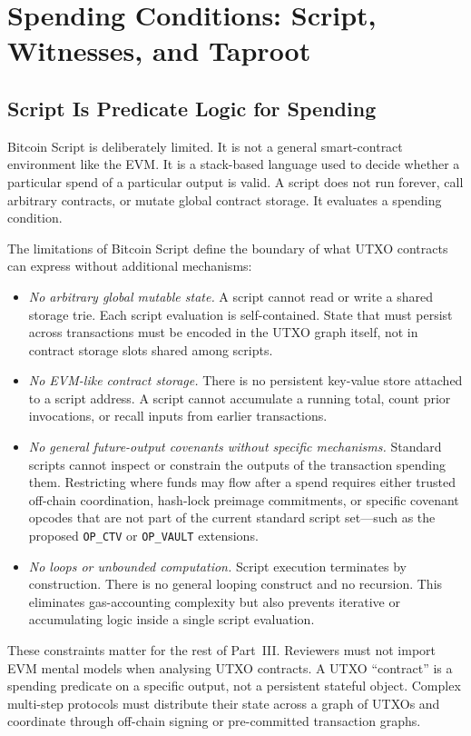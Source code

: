 \section{Spending Conditions: Script, Witnesses, and Taproot}

\subsection{Script Is Predicate Logic for Spending}

Bitcoin Script is deliberately limited. It is not a general smart-contract environment like the EVM. It is a stack-based language used to decide whether a particular spend of a particular output is valid. A script does not run forever, call arbitrary contracts, or mutate global contract storage. It evaluates a spending condition.

The limitations of Bitcoin Script define the boundary of what UTXO contracts can express without additional mechanisms:

\begin{itemize}
\item \emph{No arbitrary global mutable state.} A script cannot read or write a shared storage trie. Each script evaluation is self-contained. State that must persist across transactions must be encoded in the UTXO graph itself, not in contract storage slots shared among scripts.
\item \emph{No EVM-like contract storage.} There is no persistent key-value store attached to a script address. A script cannot accumulate a running total, count prior invocations, or recall inputs from earlier transactions.
\item \emph{No general future-output covenants without specific mechanisms.} Standard scripts cannot inspect or constrain the outputs of the transaction spending them. Restricting where funds may flow after a spend requires either trusted off-chain coordination, hash-lock preimage commitments, or specific covenant opcodes that are not part of the current standard script set---such as the proposed \texttt{OP\_CTV} or \texttt{OP\_VAULT} extensions.
\item \emph{No loops or unbounded computation.} Script execution terminates by construction. There is no general looping construct and no recursion. This eliminates gas-accounting complexity but also prevents iterative or accumulating logic inside a single script evaluation.
\end{itemize}

These constraints matter for the rest of Part~III. Reviewers must not import EVM mental models when analysing UTXO contracts. A UTXO ``contract'' is a spending predicate on a specific output, not a persistent stateful object. Complex multi-step protocols must distribute their state across a graph of UTXOs and coordinate through off-chain signing or pre-committed transaction graphs.

